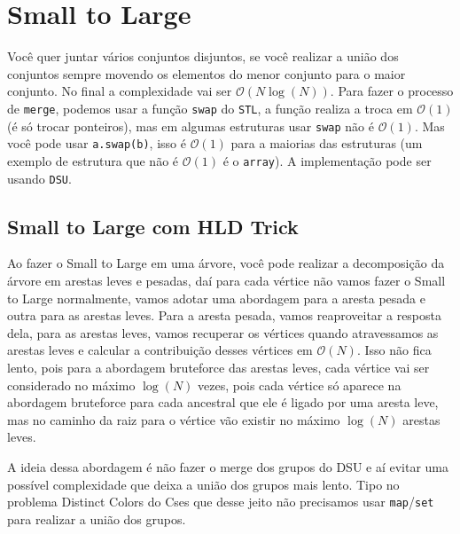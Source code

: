     
    \section{Small to Large}
    Você quer juntar vários conjuntos disjuntos, se você realizar a união dos conjuntos sempre movendo os elementos do menor conjunto para o maior conjunto. No final a complexidade vai ser $\mathcal{O}(N\log(N))$. Para fazer o processo de \texttt{merge}, podemos usar a função \texttt{swap} do \texttt{STL}, a função realiza a troca em $\mathcal{O}(1)$ (é só trocar ponteiros), mas em algumas estruturas usar \texttt{swap} não é $\mathcal{O}(1)$. Mas você pode usar \texttt{a.swap(b)}, isso é $\mathcal{O}(1)$ para a maiorias das estruturas (um exemplo de estrutura que não é $\mathcal{O}(1)$ é o \texttt{array}). A implementação pode ser usando \texttt{DSU}.


\subsection{Small to Large com HLD Trick}
Ao fazer o Small to Large em uma árvore, você pode realizar a decomposição da árvore em arestas leves e pesadas, daí para cada vértice não vamos fazer o Small to Large normalmente, vamos adotar uma abordagem para a aresta pesada e outra para as arestas leves. Para a aresta pesada, vamos reaproveitar a resposta dela, para as arestas leves, vamos recuperar os vértices quando atravessamos as arestas leves e calcular a contribuição desses vértices em $\mathcal{O}(N)$. Isso não fica lento, pois para a abordagem bruteforce das arestas leves, cada vértice vai ser considerado no máximo $\log(N)$ vezes, pois cada vértice só aparece na abordagem bruteforce para cada ancestral que ele é ligado por uma aresta leve, mas no caminho da raiz para o vértice vão existir no máximo $\log(N)$ arestas leves.

A ideia dessa abordagem é não fazer o merge dos grupos do DSU e aí evitar uma possível complexidade que deixa a união dos grupos mais lento. Tipo no problema Distinct Colors do Cses que desse jeito não precisamos usar \texttt{map}/\texttt{set} para realizar a união dos grupos.

